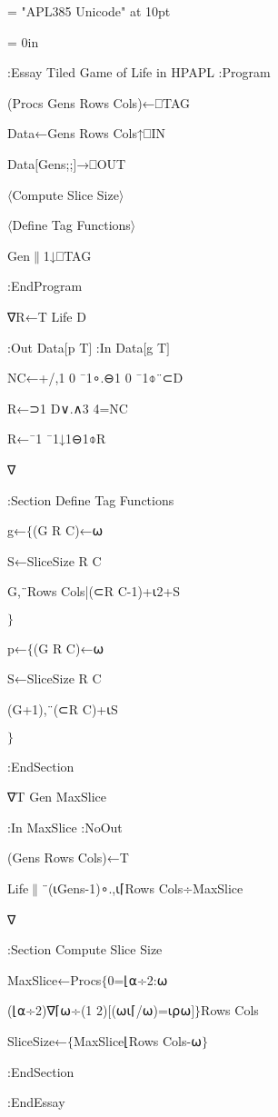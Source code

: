 \font\rm = "APL385 Unicode" at 10pt

\rm\parindent = 0in

:Essay Tiled Game of Life in HPAPL
\medskip
:Program\par
(Procs Gens Rows Cols)←⎕TAG\par
Data←Gens Rows Cols↑⎕IN\par
Data$[$Gens;;$]$→⎕OUT\par
$\langle$Compute Slice Size$\rangle$\par
$\langle$Define Tag Functions$\rangle$\par
Gen$\|$1↓⎕TAG\par
:EndProgram\par
\medskip\par
∇R←T Life D\par
:Out Data$[$p T$]$ :In Data$[$g T$]$\par
NC←+/,1 0 ¯1∘.⊖1 0 ¯1⌽¨⊂D\par
R←⊃1 D∨.∧3 4=NC\par
R←¯1 ¯1↓1⊖1⌽R\par
∇\par
\medskip
:Section Define Tag Functions\par
g←$\{$(G R C)←⍵\par
  S←SliceSize R C\par
  G,¨Rows Cols|(⊂R C-1)+⍳2+S\par
$\}$\par
p←$\{$(G R C)←⍵\par
  S←SliceSize R C\par
  (G+1),¨(⊂R C)+⍳S\par
$\}$\par
:EndSection\par
\medskip
∇T Gen MaxSlice\par
:In MaxSlice :NoOut\par
(Gens Rows Cols)←T\par
Life$\|$¨(⍳Gens-1)∘.,⍳⌈Rows Cols÷MaxSlice\par
∇\par
\medskip
:Section Compute Slice Size\par
MaxSlice←Procs$\{$0=⌊⍺÷2:⍵\par
               (⌊⍺÷2)∇⌈⍵÷(1 2)$[$(⍵⍳⌈/⍵)=⍳⍴⍵$]$$\}$Rows Cols\par
SliceSize←$\{$MaxSlice⌊Rows Cols-⍵$\}$\par
:EndSection\par
\medskip
:EndEssay\par

\bye
